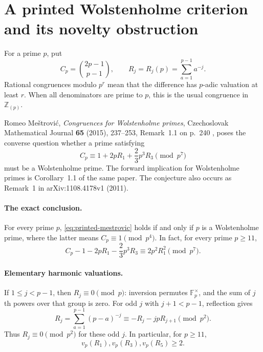 \documentclass[11pt,a4paper]{article}
\theoremstyle{definition}
\theoremstyle{remark}
\begin{document}
\section{A printed Wolstenholme criterion and its novelty obstruction}

For a prime $p$, put
\[
 C_p=\binom{2p-1}{p-1},\qquad
 R_j=R_j(p)=\sum_{a=1}^{p-1}a^{-j}.
\]
Rational congruences modulo $p^r$ mean that the difference has $p$-adic
valuation at least $r$.  When all denominators are prime to $p$, this is the
usual congruence in $\mathbb Z_{(p)}$.

Romeo Me\v{s}trovi\'c, \emph{Congruences for Wolstenholme primes},
Czechoslovak Mathematical Journal \textbf{65} (2015), 237--253,
Remark~1.1 on p.~240 \cite{Mestrovic2015}, poses the converse question whether a prime satisfying
\begin{equation}\label{eq:printed-mestrovic}
 C_p\equiv 1+2pR_1+\frac23p^3R_3\pmod{p^7}
\end{equation}
must be a Wolstenholme prime.  The forward implication for Wolstenholme
primes is Corollary~1.1 of the same paper.  The conjecture also occurs as
Remark~1 in arXiv:1108.4178v1 (2011).

\paragraph{The exact conclusion.}
For every prime $p$, \eqref{eq:printed-mestrovic} holds if and only if
$p$ is a Wolstenholme prime, where the latter means
$C_p\equiv1\pmod{p^4}$.  In fact, for every prime $p\ge11$,
\begin{equation}\label{eq:square-defect}
 C_p-1-2pR_1-\frac23p^3R_3
 \equiv 2p^2R_1^2\pmod{p^7}.
\end{equation}

\paragraph{Elementary harmonic valuations.}
If $1\le j<p-1$, then $R_j\equiv0\pmod p$: inversion permutes
$\mathbb F_p^\times$, and the sum of $j$th powers over that group is zero.
For odd $j$ with $j+1<p-1$, reflection gives
\[
 R_j=\sum_{a=1}^{p-1}(p-a)^{-j}
 \equiv -R_j-jpR_{j+1}\pmod{p^2}.
\]
Thus $R_j\equiv0\pmod{p^2}$ for these odd $j$.
In particular, for $p\ge11$,
\[
 v_p(R_1),v_p(R_3),v_p(R_5)\ge2.
\]
\end{document}

